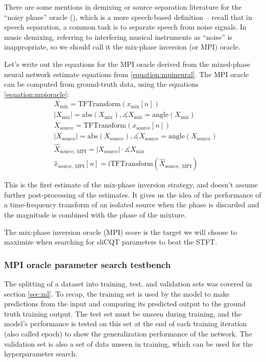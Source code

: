 \documentclass[report.tex]{subfiles}
\begin{document}
There are some mentions in demixing or source separation literature for the ``noisy phase'' oracle (\cite{noisyphase1, noisyphase2}), which is a more speech-based definition -- recall that in speech separation, a common task is to separate speech from noise signals. In music demixing, referring to interfering musical instruments as ``noise'' is inappropriate, so we should call it the mix-phase inversion (or MPI) oracle.

Let's write out the equations for the MPI oracle derived from the mixed-phase neural network estimate equations from \ref{equation:mpineural}. The MPI oracle can be computed from ground-truth data, using the equations \ref{equation:mpioracle}:
\begin{align}\tag{4}\label{equation:mpioracle}
	\nonumber & X_{\text{mix}} = \text{TFTransform}(x_{\text{mix}}[n])\\
	\nonumber & |X_{\text{mix}}| = \text{abs}(X_{\text{mix}}), \measuredangle{X_{\text{mix}}} = \text{angle}(X_{\text{mix}})\\
	\nonumber & X_{\text{source}} = \text{TFTransform}(x_{\text{source}}[n])\\
	\nonumber & |X_{\text{source}}| = \text{abs}(X_{\text{source}}), \measuredangle{X_{\text{source}}} = \text{angle}(X_{\text{source}})\\
	\nonumber & \hat{X}_{\text{source, MPI}} = |X_{\text{source}}| \cdot \measuredangle{X_{\text{mix}}}\\
	\nonumber & \hat{x}_{\text{source, MPI}}[n] = \text{iTFTransform}(\hat{X}_{\text{source, MPI}})
\end{align}

This is the first estimate of the mix-phase inversion strategy, and doesn't assume further post-processing of the estimates. It gives us the idea of the performance of a time-frequency transform of an isolated source when the phase is discarded and the magnitude is combined with the phase of the mixture.

The mix-phase inversion oracle (MPI) score is the target we will choose to maximize when searching for sliCQT parameters to beat the STFT.

\subsubsection{MPI oracle parameter search testbench}

The splitting of a dataset into training, test, and validation sets was covered in section \ref{sec:ml}. To recap, the training set is used by the model to make predictions from the input and comparing its predicted output to the ground truth training output. The test set must be unseen during training, and the model's performance is tested on this set at the end of each training iteration (also called epoch) to show the generalization performance of the network. The validation set is also a set of data unseen in training, which can be used for the hyperparameter search.
\end{document}
